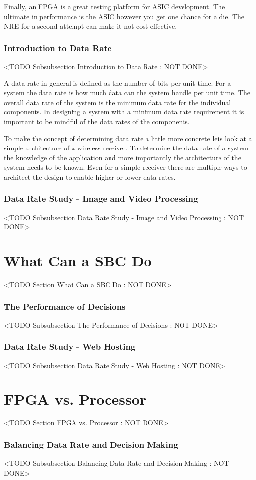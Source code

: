 Finally, an FPGA is a great testing platform for ASIC development. The ultimate in performance is the ASIC however you get one chance for a die. The NRE for a second attempt can make it not cost effective.

\subsubsection{Introduction to Data Rate}
	<TODO Subsubsection  Introduction to Data Rate : NOT DONE>

A data rate in general is defined as the number of bits per unit time. For a system the data rate is how much data can the system handle per unit time. The overall data rate of the system is the minimum data rate for the individual components. In designing a system with a minimum data rate requirement it is important to be mindful of the data rates of the components.

To make the concept of determining data rate a little more concrete lets look at a simple architecture of a wireless receiver. To determine the data rate of a system the knowledge of the application and more importantly the architecture of the system needs to be known. Even for a simple receiver there are multiple ways to architect the design to enable higher or lower data rates. 

\subsubsection{Data Rate Study - Image and Video Processing}
	<TODO Subsubsection  Data Rate Study - Image and Video Processing : NOT DONE>

\section{What Can a SBC Do}
	<TODO Section What Can a SBC Do : NOT DONE>

\subsubsection{The Performance of Decisions}
	<TODO Subsubsection  The Performance of Decisions : NOT DONE>

\subsubsection{Data Rate Study - Web Hosting}
	<TODO Subsubsection  Data Rate Study - Web Hosting : NOT DONE>

\section{FPGA vs. Processor}
	<TODO Section FPGA vs. Processor : NOT DONE>

\subsubsection{Balancing Data Rate and Decision Making}
	<TODO Subsubsection  Balancing Data Rate and Decision Making : NOT DONE>
